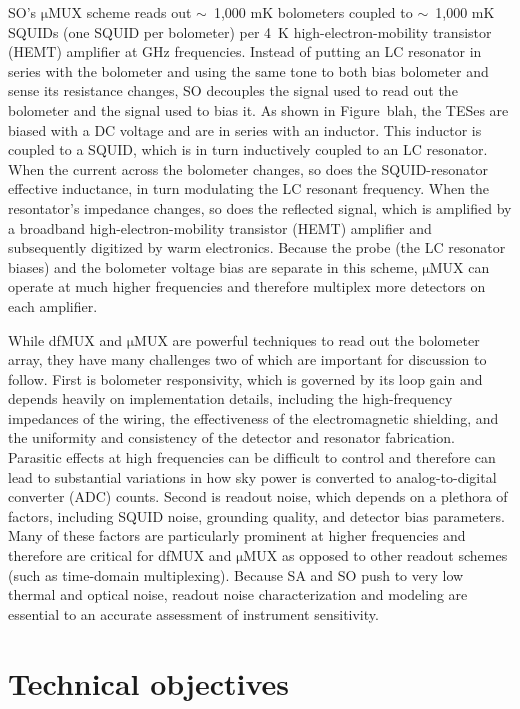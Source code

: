 SO's $\mathrm{\mu}$MUX scheme reads out $\sim$~1,000 mK bolometers coupled to $\sim$~1,000 mK SQUIDs (one SQUID per bolometer) per 4~K high-electron-mobility transistor (HEMT) amplifier at GHz frequencies. Instead of putting an LC resonator in series with the bolometer and using the same tone to both bias bolometer and sense its resistance changes, SO decouples the signal used to read out the bolometer and the signal used to bias it. As shown in Figure~blah, the TESes are biased with a DC voltage and are in series with an inductor. This inductor is coupled to a SQUID, which is in turn inductively coupled to an LC resonator. When the current across the bolometer changes, so does the SQUID-resonator effective inductance, in turn modulating the LC resonant frequency. When the resontator's impedance changes, so does the reflected signal, which is amplified by a broadband high-electron-mobility transistor (HEMT) amplifier and subsequently digitized by warm electronics. Because the probe (the LC resonator biases) and the bolometer voltage bias are separate in this scheme, $\mathrm{\mu}$MUX can operate at much higher frequencies and therefore multiplex more detectors on each amplifier.

While dfMUX and $\mathrm{\mu}$MUX are powerful techniques to read out the bolometer array, they have many challenges two of which are important for discussion to follow. First is bolometer responsivity, which is governed by its loop gain and depends heavily on implementation details, including the high-frequency impedances of the wiring, the effectiveness of the electromagnetic shielding, and the uniformity and consistency of the detector and resonator fabrication. Parasitic effects at high frequencies can be difficult to control and therefore can lead to substantial variations in how sky power is converted to analog-to-digital converter (ADC) counts. Second is readout noise, which depends on a plethora of factors, including SQUID noise, grounding quality, and detector bias parameters. Many of these factors are particularly prominent at higher frequencies and therefore are critical for dfMUX and $\mathrm{\mu}$MUX as opposed to other readout schemes (such as time-domain multiplexing). Because SA and SO push to very low thermal and optical noise, readout noise characterization and modeling are essential to an accurate assessment of instrument sensitivity.


\section{Technical objectives}
